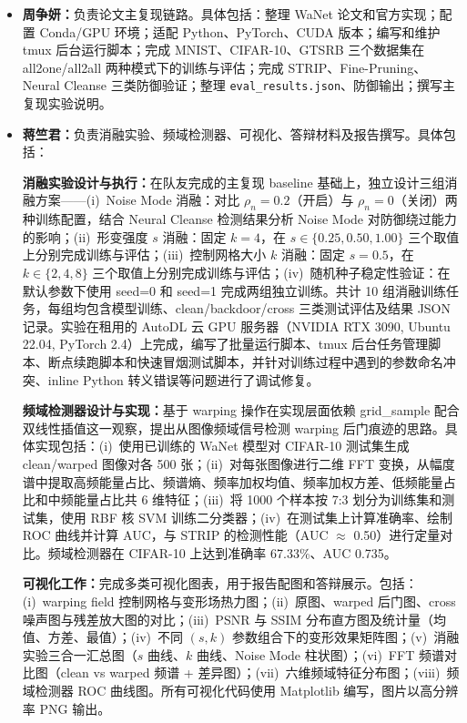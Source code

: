 \documentclass[UTF8,zihao=-4]{ctexart}
\begin{document}
\begin{itemize}
    \item \textbf{周争妍：}负责论文主复现链路。具体包括：整理 WaNet 论文和官方实现；配置 Conda/GPU 环境；适配 Python、PyTorch、CUDA 版本；编写和维护 tmux 后台运行脚本；完成 MNIST、CIFAR-10、GTSRB 三个数据集在 all2one/all2all 两种模式下的训练与评估；完成 STRIP、Fine-Pruning、Neural Cleanse 三类防御验证；整理 \texttt{eval\_results.json}、防御输出；撰写主复现实验说明。
    \item \textbf{蒋竺君：}负责消融实验、频域检测器、可视化、答辩材料及报告撰写。具体包括：

    \textbf{消融实验设计与执行：}在队友完成的主复现 baseline 基础上，独立设计三组消融方案——(i)~Noise Mode 消融：对比 $\rho_n=0.2$（开启）与 $\rho_n=0$（关闭）两种训练配置，结合 Neural Cleanse 检测结果分析 Noise Mode 对防御绕过能力的影响；(ii)~形变强度 $s$ 消融：固定 $k=4$，在 $s\in\{0.25,0.50,1.00\}$ 三个取值上分别完成训练与评估；(iii)~控制网格大小 $k$ 消融：固定 $s=0.5$，在 $k\in\{2,4,8\}$ 三个取值上分别完成训练与评估；(iv)~随机种子稳定性验证：在默认参数下使用 seed=0 和 seed=1 完成两组独立训练。共计 10 组消融训练任务，每组均包含模型训练、clean/backdoor/cross 三类测试评估及结果 JSON 记录。实验在租用的 AutoDL 云 GPU 服务器（NVIDIA RTX 3090, Ubuntu 22.04, PyTorch 2.4）上完成，编写了批量运行脚本、tmux 后台任务管理脚本、断点续跑脚本和快速冒烟测试脚本，并针对训练过程中遇到的参数命名冲突、inline Python 转义错误等问题进行了调试修复。

    \textbf{频域检测器设计与实现：}基于 warping 操作在实现层面依赖 grid\_sample 配合双线性插值这一观察，提出从图像频域信号检测 warping 后门痕迹的思路。具体实现包括：(i)~使用已训练的 WaNet 模型对 CIFAR-10 测试集生成 clean/warped 图像对各 500 张；(ii)~对每张图像进行二维 FFT 变换，从幅度谱中提取高频能量占比、频谱熵、频率加权均值、频率加权方差、低频能量占比和中频能量占比共 6 维特征；(iii)~将 1000 个样本按 7:3 划分为训练集和测试集，使用 RBF 核 SVM 训练二分类器；(iv)~在测试集上计算准确率、绘制 ROC 曲线并计算 AUC，与 STRIP 的检测性能（AUC $\approx$ 0.50）进行定量对比。频域检测器在 CIFAR-10 上达到准确率 67.33\%、AUC 0.735。

    \textbf{可视化工作：}完成多类可视化图表，用于报告配图和答辩展示。包括：(i)~warping field 控制网格与变形场热力图；(ii)~原图、warped 后门图、cross 噪声图与残差放大图的对比；(iii)~PSNR 与 SSIM 分布直方图及统计量（均值、方差、最值）；(iv)~不同 $(s,k)$ 参数组合下的变形效果矩阵图；(v)~消融实验三合一汇总图（$s$ 曲线、$k$ 曲线、Noise Mode 柱状图）；(vi)~FFT 频谱对比图（clean vs warped 频谱 + 差异图）；(vii)~六维频域特征分布图；(viii)~频域检测器 ROC 曲线图。所有可视化代码使用 Matplotlib 编写，图片以高分辨率 PNG 输出。


\end{itemize}
\end{document}

